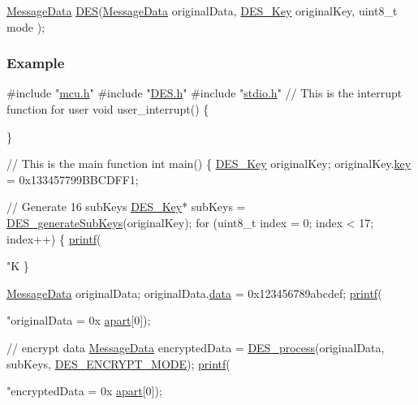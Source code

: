 \begin{DoxyCode}
\mbox{\hyperlink{a00194}{MessageData}} \mbox{\hyperlink{a00023_a26f09735ce4f946320fee32bfa4a5ef5}{DES}}(\mbox{\hyperlink{a00194}{MessageData}} originalData, \mbox{\hyperlink{a00190}{DES\_Key}} originalKey, uint8\_t mode
      );
\end{DoxyCode}


\subsubsection*{Example}


\begin{DoxyCode}
\textcolor{preprocessor}{#include "\mbox{\hyperlink{a00068}{mcu.h}}"}
\textcolor{preprocessor}{#include "\mbox{\hyperlink{a00026}{DES.h}}"}
\textcolor{preprocessor}{#include "\mbox{\hyperlink{a00095}{stdio.h}}"}
\textcolor{comment}{// This is the interrupt function for user}
\textcolor{keywordtype}{void} user\_interrupt() \{

\}

\textcolor{comment}{// This is the main function}
\textcolor{keywordtype}{int} main() \{
    \mbox{\hyperlink{a00190}{DES\_Key}} originalKey;
    originalKey.\mbox{\hyperlink{a00190_a48b5dadf7decf3076826072563041f1b}{key}} = 0x133457799BBCDFF1;

    \textcolor{comment}{// Generate 16 subKeys}
    \mbox{\hyperlink{a00190}{DES\_Key}}* subKeys = \mbox{\hyperlink{a00023_a3ef9fea40f3c593468a2bb7862abfa0d}{DES\_generateSubKeys}}(originalKey);
    \textcolor{keywordflow}{for} (uint8\_t index = 0; index < 17; index++) \{
        \mbox{\hyperlink{a00095_a133c04c35a1c14c6f8d8078831705661}{printf}}(\textcolor{stringliteral}{"K%
    \}

    \mbox{\hyperlink{a00194}{MessageData}} originalData;
    originalData.\mbox{\hyperlink{a00194_a2cf9dd28d0679205048930fe98fa116b}{data}} = 0x123456789abcdef;
    \mbox{\hyperlink{a00095_a133c04c35a1c14c6f8d8078831705661}{printf}}(\textcolor{stringliteral}{"originalData = 0x%
      \mbox{\hyperlink{a00194_a43406dd2e72f1230b8f70551a96699c5}{apart}}[0]);

    \textcolor{comment}{// encrypt data}
    \mbox{\hyperlink{a00194}{MessageData}} encryptedData = \mbox{\hyperlink{a00023_a0c6c5c79645bfd3166aeb494b41a82f8}{DES\_process}}(originalData, subKeys, 
      \mbox{\hyperlink{a00026_a73b9a4e1e36c14eb7a44556ee767f106}{DES\_ENCRYPT\_MODE}});
    \mbox{\hyperlink{a00095_a133c04c35a1c14c6f8d8078831705661}{printf}}(\textcolor{stringliteral}{"encryptedData = 0x%
      \mbox{\hyperlink{a00194_a43406dd2e72f1230b8f70551a96699c5}{apart}}[0]);

}}}
\end{DoxyCode}
